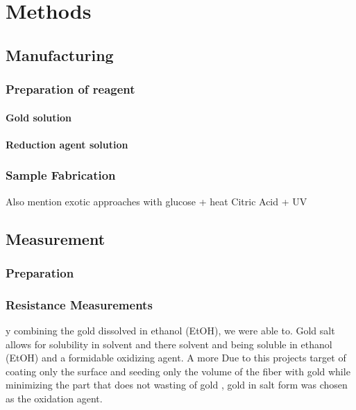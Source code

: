 \section{Methods}

\subsection{Manufacturing}

\subsubsection{Preparation of reagent}

\paragraph{Gold solution}

\paragraph{Reduction agent solution}

\subsubsection{Sample Fabrication}

Also mention exotic approaches with glucose + heat
Citric Acid + UV

\subsection{Measurement}
\subsubsection{Preparation}

\subsubsection{Resistance Measurements}

y combining the gold dissolved in ethanol (EtOH), we were able to. Gold salt allows for solubility in solvent and there solvent and  being soluble in ethanol (EtOH) and a formidable oxidizing agent. A more 
Due to this projects target of coating only the surface and seeding only the volume of the fiber with gold while minimizing the part that does not wasting of gold , gold in salt form was chosen as the oxidation agent.